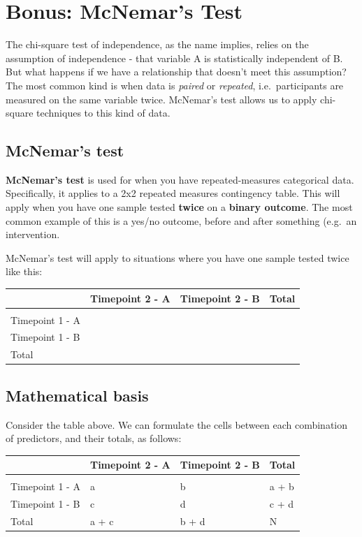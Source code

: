 \documentclass[
]{book}
\begin{document}
\section{Bonus: McNemar's Test}\label{bonus-mcnemars-test}

The chi-square test of independence, as the name implies, relies on the assumption of independence - that variable A is statistically independent of B. But what happens if we have a relationship that doesn't meet this assumption? The most common kind is when data is \emph{paired} or \emph{repeated}, i.e.~participants are measured on the same variable twice. McNemar's test allows us to apply chi-square techniques to this kind of data.

\subsection{McNemar's test}\label{mcnemars-test}

\textbf{McNemar's test} is used for when you have repeated-measures categorical data. Specifically, it applies to a 2x2 repeated measures contingency table. This will apply when you have one sample tested \textbf{twice} on a \textbf{binary outcome}. The most common example of this is a yes/no outcome, before and after something (e.g.~an intervention.

McNemar's test will apply to situations where you have one sample tested twice like this:

\begin{tabular}{l|l|l|l}
\hline
 & Timepoint 2 - A & Timepoint 2 - B & Total\\
\hline
 &  &  & \\
\hline
Timepoint 1 - A &  &  & \\
\hline
Timepoint 1 - B &  &  & \\
\hline
Total &  &  & \\
\hline
\end{tabular}

\subsection{Mathematical basis}\label{mathematical-basis}

Consider the table above. We can formulate the cells between each combination of predictors, and their totals, as follows:

\begin{tabular}{l|l|l|l}
\hline
 & Timepoint 2 - A & Timepoint 2 - B & Total\\
\hline
 &  &  & \\
\hline
Timepoint 1 - A & a & b & a + b\\
\hline
Timepoint 1 - B & c & d & c + d\\
\hline
Total & a + c & b + d & N\\
\hline
\end{tabular}
\end{document}
